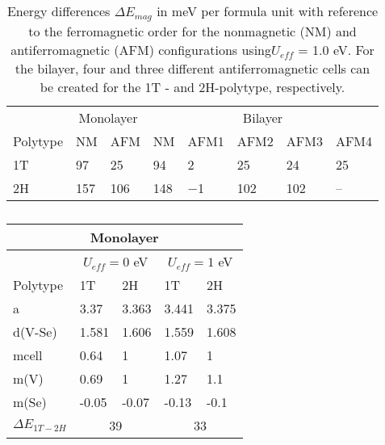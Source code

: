 \documentclass[reprint, aps, prb, showkeys]{revtex4-2}
\begin{document}
\begin{table}[]
    \caption{\label{table:PhysRevB.96.235147_MagConfiguration} Energy differences $\Delta E_{mag}$ in meV per formula unit with reference to the ferromagnetic order for the nonmagnetic (NM) and antiferromagnetic (AFM) configurations using$U_{eff}$ = 1.0 eV. For the bilayer, four and three different antiferromagnetic cells can be created for the 1T - and 2H-polytype, respectively. 
    }
    \begin{ruledtabular}
    \begin{tabular}{llllllll}
             & \multicolumn{2}{c}{Monolayer} & \multicolumn{5}{c}{Bilayer}     \\
    Polytype & NM            & AFM           & NM  & AFM1 & AFM2 & AFM3 & AFM4 \\
    1T       & 97            & 25            & 94  & 2    & 25   & 24   & 25   \\
    2H       & 157           & 106           & 148 & −1   & 102  & 102  & –   
    \end{tabular}
    \end{ruledtabular}
\end{table}

\begin{table}[]
    \caption{\label{table:PhysRevB.96.235147_Hubbard-U_Monolayer} 
    }
    \begin{ruledtabular}
        \begin{tabular}{lllll}
            \multicolumn{5}{c}{Monolayer}                                                                      \\
            \hline
                               & \multicolumn{2}{c}{$U_{eff} = 0 $ eV} & \multicolumn{2}{c}{$U_{eff} = 1 $ eV} \\
            Polytype           & 1T                & 2H                & 1T                & 2H                \\
            \hline
            a                  & 3.37              & 3.363             & 3.441             & 3.375             \\
            d(V-Se)            & 1.581             & 1.606             & 1.559             & 1.608             \\
            mcell              & 0.64              & 1                 & 1.07              & 1                 \\
            m(V)               & 0.69              & 1                 & 1.27              & 1.1               \\
            m(Se)              & -0.05             & -0.07             & -0.13             & -0.1              \\
            $\Delta E_{1T-2H}$ & \multicolumn{2}{c}{39}                & \multicolumn{2}{c}{33}               
            \end{tabular}
    \end{ruledtabular}
\end{table}
\end{document}
